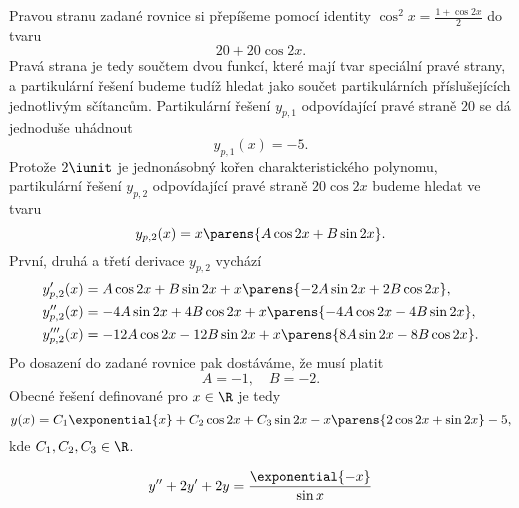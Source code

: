 \documentclass[answers]{exam}
\begin{document}
\begin{questions}
\begin{solution}
  	Pravou stranu zadané rovnice si přepíšeme pomocí identity $\cos^2 x = \frac{1 + \cos 2x}{2}$ do tvaru
  	\begin{equation*}
  		20 + 20 \cos 2x.
  	\end{equation*}
  	Pravá strana je tedy součtem dvou funkcí, které mají tvar speciální pravé strany, a partikulární řešení budeme tudíž hledat jako součet partikulárních příslušejících jednotlivým sčítancům. Partikulární řešení $y_{p, 1}$ odpovídající pravé straně $20$ se dá jednoduše uhádnout
  	\begin{equation*}
  		y_{p, 1}(x) = -5.
  	\end{equation*}
  	Protože $2\iunit$ je jednonásobný kořen charakteristického polynomu, partikulární řešení $y_{p, 2}$ odpovídající pravé straně $20 \cos 2x$ budeme hledat ve tvaru
  	\begin{equation*}
  	 y_{p, 2}(x)
  	 =
  	 x \parens{A \cos 2x + B \sin 2x}.
  	\end{equation*}
  	První, druhá a třetí derivace $y_{p, 2}$ vychází
  	\begin{align*}
  		y_{p, 2}'(x) &= A \cos 2x + B \sin 2x + x \parens{-2 A \sin 2x + 2 B \cos 2x},
  		\\
  		y_{p, 2}''(x) &= - 4 A \sin 2x + 4 B \cos 2x + x \parens{- 4 A \cos 2x - 4 B \sin 2x},
  		\\
  		y_{p, 2}'''(x) &= - 12 A \cos 2x - 12 B \sin 2x + x \parens{8 A \sin 2x - 8 B \cos 2x}.
   	\end{align*}
  	Po dosazení do zadané rovnice pak dostáváme, že musí platit
  	\begin{equation*}
  		A = -1, \quad B = -2.
  	\end{equation*}
  	Obecné řešení definované pro $x \in \R$ je tedy
  	\begin{equation*}
  		y(x) = C_1 \exponential{x} + C_2 \cos 2x + C_3 \sin 2x - x \parens{2 \cos 2x + \sin 2x} - 5, 
  	\end{equation*}
  	kde $C_1, C_2, C_3 \in \R$.
  \end{solution}

  \question
  \begin{equation*}
    y'' + 2y' + 2y = \frac{\exponential{-x}}{\sin x}
  \end{equation*}
  

\end{questions}
\end{document}
